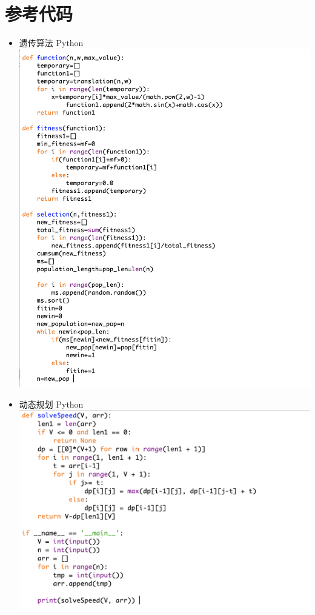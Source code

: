\documentclass[withoutpreface,bwprint]{cumcmthesis}
\begin{document}
\section{参考代码}
\begin{itemize}
	\item 遗传算法 Python\\
	\includegraphics[scale = 0.6]{code1.png}
	\item 动态规划 Python\\
	\includegraphics[scale = 0.6]{code2.png}
\end{itemize}
\newpage
\end{document}
